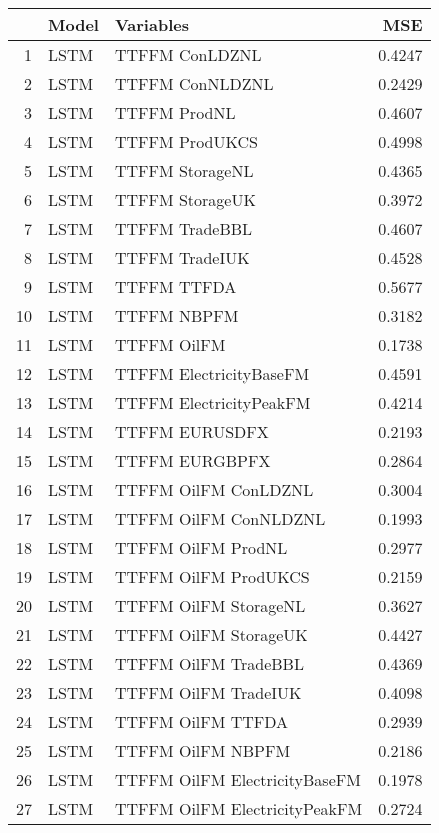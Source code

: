 \begin{table}[ht]
\centering
\begin{tabular}{rllr}
  \hline
 & Model & Variables & MSE \\ 
  \hline
1 & LSTM & TTFFM ConLDZNL & 0.4247 \\ 
  2 & LSTM & TTFFM ConNLDZNL & 0.2429 \\ 
  3 & LSTM & TTFFM ProdNL & 0.4607 \\ 
  4 & LSTM & TTFFM ProdUKCS & 0.4998 \\ 
  5 & LSTM & TTFFM StorageNL & 0.4365 \\ 
  6 & LSTM & TTFFM StorageUK & 0.3972 \\ 
  7 & LSTM & TTFFM TradeBBL & 0.4607 \\ 
  8 & LSTM & TTFFM TradeIUK & 0.4528 \\ 
  9 & LSTM & TTFFM TTFDA & 0.5677 \\ 
  10 & LSTM & TTFFM NBPFM & 0.3182 \\ 
  11 & LSTM & TTFFM OilFM & 0.1738 \\ 
  12 & LSTM & TTFFM ElectricityBaseFM & 0.4591 \\ 
  13 & LSTM & TTFFM ElectricityPeakFM & 0.4214 \\ 
  14 & LSTM & TTFFM EURUSDFX & 0.2193 \\ 
  15 & LSTM & TTFFM EURGBPFX & 0.2864 \\ 
  16 & LSTM & TTFFM OilFM ConLDZNL & 0.3004 \\ 
  17 & LSTM & TTFFM OilFM ConNLDZNL & 0.1993 \\ 
  18 & LSTM & TTFFM OilFM ProdNL & 0.2977 \\ 
  19 & LSTM & TTFFM OilFM ProdUKCS & 0.2159 \\ 
  20 & LSTM & TTFFM OilFM StorageNL & 0.3627 \\ 
  21 & LSTM & TTFFM OilFM StorageUK & 0.4427 \\ 
  22 & LSTM & TTFFM OilFM TradeBBL & 0.4369 \\ 
  23 & LSTM & TTFFM OilFM TradeIUK & 0.4098 \\ 
  24 & LSTM & TTFFM OilFM TTFDA & 0.2939 \\ 
  25 & LSTM & TTFFM OilFM NBPFM & 0.2186 \\ 
  26 & LSTM & TTFFM OilFM ElectricityBaseFM & 0.1978 \\ 
  27 & LSTM & TTFFM OilFM ElectricityPeakFM & 0.2724 \\ 

\end{tabular}
\end{table}

